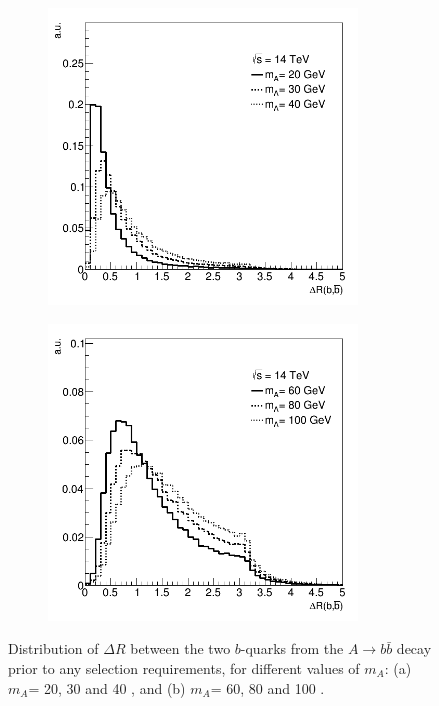 \begin{figure}[htbp!]
\centering
\begin{subfigure}{0.45\textwidth}
  \centering
  \includegraphics[width=0.9\textwidth]{figures/ttA/DRbb.png}
  \caption{}
  \label{}
\end{subfigure}
\begin{subfigure}{0.45\textwidth}
  \centering
  \includegraphics[width=0.9\textwidth]{figures/ttA/DRbb2.png}
  \caption{}
  \label{}
\end{subfigure}
\captionsetup{width=0.85\textwidth} \caption{\small Distribution of $\Delta R$ between the two $b$-quarks from the $A\to b \bar{b}$ decay prior to any selection requirements, for different
values of $m_{A}$: (a) $m_{A}$= 20, 30 and 40 \gev, and (b) $m_{A}$= 60, 80 and 100 \gev.}
\label{sec:ttA:fig:drbb}
\end{figure}

